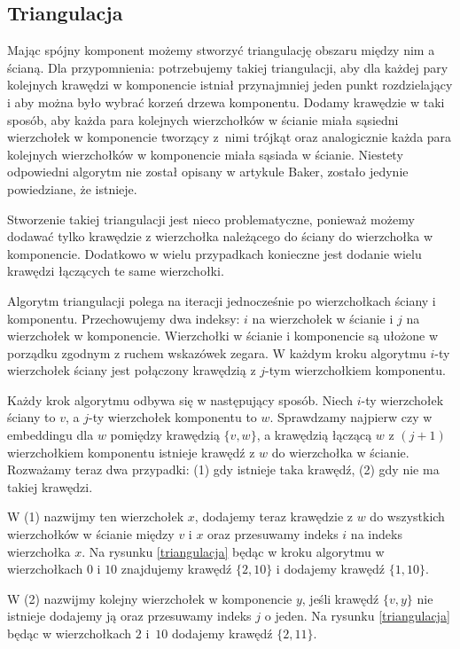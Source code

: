 \documentclass[twoside,a4paper,12pt]{report} %
\theoremstyle{break}
\begin{document}
\subsection{Triangulacja} \label{sec.triangulacja}
Mając spójny komponent możemy stworzyć triangulację obszaru między nim a ścianą. Dla przypomnienia: potrzebujemy takiej triangulacji, aby dla każdej pary kolejnych krawędzi w komponencie istniał przynajmniej jeden punkt rozdzielający i aby można było wybrać korzeń drzewa komponentu. Dodamy krawędzie w taki sposób, aby każda para kolejnych wierzchołków w ścianie miała sąsiedni wierzchołek w komponencie tworzący z~nimi trójkąt oraz analogicznie każda para kolejnych wierzchołków w komponencie miała sąsiada w ścianie. Niestety odpowiedni algorytm nie został opisany w artykule Baker, zostało jedynie powiedziane, że istnieje.

Stworzenie takiej triangulacji jest nieco problematyczne, ponieważ możemy dodawać tylko krawędzie z wierzchołka należącego do ściany do wierzchołka w komponencie. Dodatkowo w wielu przypadkach konieczne jest dodanie wielu krawędzi łączących te same wierzchołki.

Algorytm triangulacji polega na iteracji jednocześnie po wierzchołkach ściany i komponentu. Przechowujemy dwa indeksy: $i$ na wierzchołek w ścianie i $j$ na wierzchołek w komponencie. Wierzchołki w ścianie i komponencie są ułożone w porządku zgodnym z ruchem wskazówek zegara. W każdym kroku algorytmu $i$-ty wierzchołek ściany jest połączony krawędzią z $j$-tym wierzchołkiem komponentu.

Każdy krok algorytmu odbywa się w następujący sposób. Niech $i$-ty wierzchołek ściany to $v$, a $j$-ty wierzchołek komponentu to $w$. Sprawdzamy najpierw czy w embeddingu dla $w$ pomiędzy krawędzią $\{v,w\}$, a krawędzią łączącą $w$ z $(j+1)$ wierzchołkiem komponentu istnieje krawędź z $w$ do wierzchołka w ścianie. Rozważamy teraz dwa przypadki: (1) gdy istnieje taka krawędź, (2) gdy nie ma takiej krawędzi. 

W (1) nazwijmy ten wierzchołek $x$, dodajemy teraz krawędzie z $w$ do wszystkich wierzchołków w ścianie między $v$ i $x$ oraz przesuwamy indeks $i$ na indeks wierzchołka $x$. Na rysunku \ref{triangulacja} będąc w kroku algorytmu w wierzchołkach $0$ i $10$ znajdujemy krawędź $\{2,10\}$ i dodajemy krawędź $\{1,10\}$.

W (2) nazwijmy kolejny wierzchołek w komponencie $y$, jeśli krawędź $\{v,y\}$ nie istnieje dodajemy ją oraz przesuwamy indeks $j$ o jeden. Na rysunku \ref{triangulacja} będąc w wierzchołkach $2$ i~$10$ dodajemy krawędź $\{2,11\}$.
\end{document}

